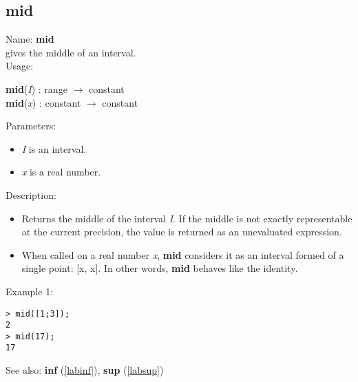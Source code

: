 \subsection{mid}
\label{labmid}
\noindent Name: \textbf{mid}\\
gives the middle of an interval.\\
\noindent Usage: 
\begin{center}
\textbf{mid}(\emph{I}) : \textsf{range} $\rightarrow$ \textsf{constant}
\\ 
\textbf{mid}(\emph{x}) : \textsf{constant} $\rightarrow$ \textsf{constant}
\\ 
\end{center}
Parameters: 
\begin{itemize}
\item \emph{I} is an interval.
\item \emph{x} is a real number.
\end{itemize}
\noindent Description: \begin{itemize}

\item Returns the middle of the interval \emph{I}. If the middle is not exactly
   representable at the current precision, the value is returned as an
   unevaluated expression.

\item When called on a real number \emph{x}, \textbf{mid} considers it as an interval formed
   of a single point: [x, x]. In other words, \textbf{mid} behaves like the identity.
\end{itemize}
\noindent Example 1: 
\begin{center}\begin{minipage}{15cm}\begin{Verbatim}[frame=single]
> mid([1;3]);
2
> mid(17);
17
\end{Verbatim}
\end{minipage}\end{center}
See also: \textbf{inf} (\ref{labinf}), \textbf{sup} (\ref{labsup})
